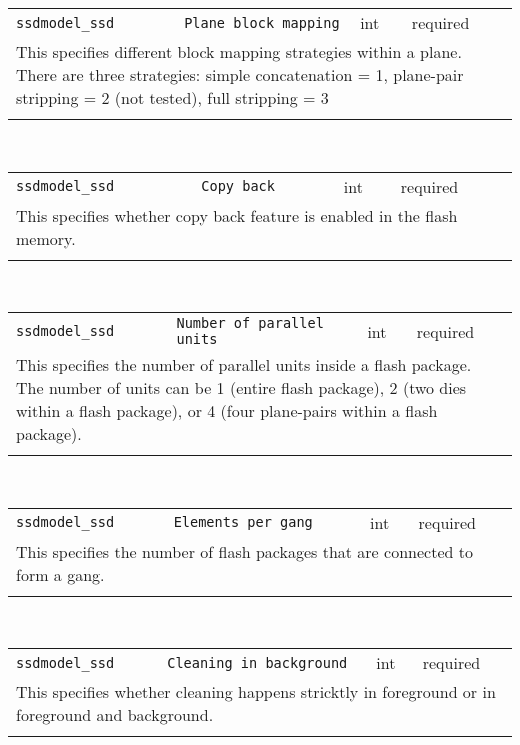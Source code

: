\noindent 
\begin{tabular}{|p{\lpmodwidth}|p{\lpnamewidth}|p{0.5in}|p{0.5in}|}
\cline{1-4}
\texttt{ssdmodel\_ssd} & \texttt{Plane block mapping} & int & required \\ 
\cline{1-4}
\multicolumn{4}{|p{6in}|}{
This specifies different block mapping strategies within a plane.
There are three strategies: simple concatenation = 1,
plane-pair stripping = 2 (not tested), full stripping = 3
}\\ 
\cline{1-4}
\multicolumn{4}{p{5in}}{}\\
\end{tabular}\\ 
\noindent 
\begin{tabular}{|p{\lpmodwidth}|p{\lpnamewidth}|p{0.5in}|p{0.5in}|}
\cline{1-4}
\texttt{ssdmodel\_ssd} & \texttt{Copy back} & int & required \\ 
\cline{1-4}
\multicolumn{4}{|p{6in}|}{
This specifies whether copy back feature is enabled in the flash memory.
}\\ 
\cline{1-4}
\multicolumn{4}{p{5in}}{}\\
\end{tabular}\\ 
\noindent 
\begin{tabular}{|p{\lpmodwidth}|p{\lpnamewidth}|p{0.5in}|p{0.5in}|}
\cline{1-4}
\texttt{ssdmodel\_ssd} & \texttt{Number of parallel units} & int & required \\ 
\cline{1-4}
\multicolumn{4}{|p{6in}|}{
This specifies the number of parallel units inside a flash package.
The number of units can be 1 (entire flash package), 2 (two dies within
a flash package), or 4 (four plane-pairs within a flash package).
}\\ 
\cline{1-4}
\multicolumn{4}{p{5in}}{}\\
\end{tabular}\\ 
\noindent 
\begin{tabular}{|p{\lpmodwidth}|p{\lpnamewidth}|p{0.5in}|p{0.5in}|}
\cline{1-4}
\texttt{ssdmodel\_ssd} & \texttt{Elements per gang} & int & required \\ 
\cline{1-4}
\multicolumn{4}{|p{6in}|}{
This specifies the number of flash packages that are connected to
form a gang.
}\\ 
\cline{1-4}
\multicolumn{4}{p{5in}}{}\\
\end{tabular}\\ 
\noindent 
\begin{tabular}{|p{\lpmodwidth}|p{\lpnamewidth}|p{0.5in}|p{0.5in}|}
\cline{1-4}
\texttt{ssdmodel\_ssd} & \texttt{Cleaning in background} & int & required \\ 
\cline{1-4}
\multicolumn{4}{|p{6in}|}{
This specifies whether cleaning happens stricktly in foreground
or in foreground and background.
}\\ 
\cline{1-4}
\multicolumn{4}{p{5in}}{}\\
\end{tabular}\\ 
